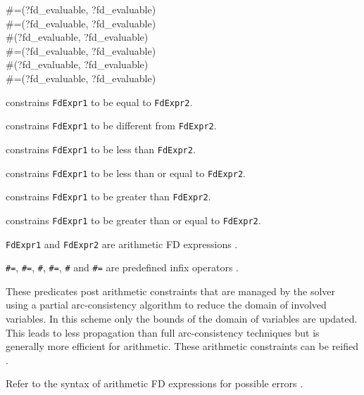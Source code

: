 \begin{TemplatesOneCol}
\#=(?fd\_evaluable, ?fd\_evaluable)\\
\#{\bs}=(?fd\_evaluable, ?fd\_evaluable)\\
\#{\lt}(?fd\_evaluable, ?fd\_evaluable)\\
\#={\lt}(?fd\_evaluable, ?fd\_evaluable)\\
\#{\gt}(?fd\_evaluable, ?fd\_evaluable)\\
\#{\gt}=(?fd\_evaluable, ?fd\_evaluable)

\end{TemplatesOneCol}

\Description

 constrains \texttt{FdExpr1} to be
equal to \texttt{FdExpr2}.

 constrains \texttt{FdExpr1}
to be different from \texttt{FdExpr2}.

 constrains \texttt{FdExpr1} to
be less than \texttt{FdExpr2}.

 constrains \texttt{FdExpr1}
to be less than or equal to \texttt{FdExpr2}.

 constrains \texttt{FdExpr1} to
be greater than \texttt{FdExpr2}.

 constrains \texttt{FdExpr1}
to be greater than or equal to \texttt{FdExpr2}.

\texttt{FdExpr1} and \texttt{FdExpr2} are arithmetic FD expressions
.

\texttt{\#=}, \texttt{\#{\bs}=}, \texttt{\#{\lt}}, \texttt{\#={\lt}},
\texttt{\#{\gt}} and \texttt{\#{\gt}=} are predefined infix operators
.

These predicates post arithmetic constraints that are managed by the solver
using a partial arc-consistency algorithm to reduce the domain of involved
variables. In this scheme only the bounds of the domain of variables are
updated. This leads to less propagation than full arc-consistency techniques
 but is generally more efficient for
arithmetic. These arithmetic constraints can be reified .

\Errors

Refer to the syntax of arithmetic FD expressions for possible errors
.

